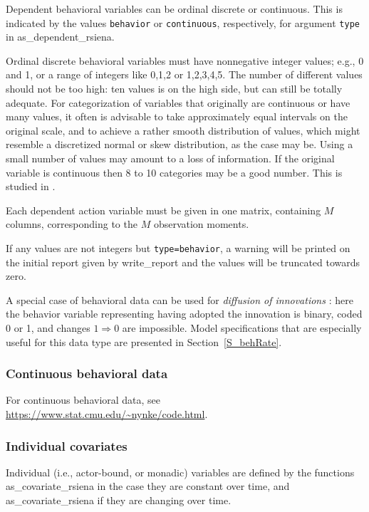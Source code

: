 \documentclass[a4paper,fleqn,11pt]{article}
\newcommand{\+}{\, + \,}
\newcommand{\sfn}[1]{\textsf{#1}}
\begin{document}
Dependent behavioral variables can be ordinal discrete or continuous.
This is indicated by the values \texttt{behavior}  or \texttt{continuous},
respectively, for argument \texttt{type} in \sfn{as\_dependent\_rsiena}.

Ordinal discrete behavioral variables must have nonnegative integer values;
e.g., 0 and 1, or a range of integers like 0,1,2 or 1,2,3,4,5.
The number of different values should not be too high: ten values
is on the high side, but can still be totally adequate.
For categorization of variables that originally are
continuous or have many values, it often is advisable to take
approximately equal intervals on the original scale, and to achieve
a rather smooth distribution of values, which might resemble a
discretized normal or skew distribution, as the case may be.
Using a small number of values may amount to a loss of information.
If the original variable is continuous then 8 to 10 categories may be
a good number. This is studied in \citet[][Chapter 6]{Niezink2018a}.

Each dependent action variable must be given in one
matrix, containing $M$ columns, corresponding to the $M$
observation moments.

If any values are not integers but \texttt{type=behavior},
a warning will be printed on the initial report
given by \sfn{write\_report} and the values will be truncated towards zero.

A special case of behavioral data can be used for
\emph{diffusion of innovations} \citep{Greenan15}:
here the behavior variable representing
having adopted the innovation is binary, coded 0 or 1, and
changes $1 \Rightarrow 0$ are impossible.
Model specifications that are especially useful for this data type
are presented in Section~\ref{S_behRate}.


\subsubsection{Continuous behavioral data}

For continuous behavioral data,
see \url{https://www.stat.cmu.edu/~nynke/code.html}.


\subsubsection{Individual covariates}
\label{S_covariates}

Individual (i.e., actor-bound, or monadic) variables
are defined by the functions
\sfn{as\_covariate\_rsiena} in the case they are constant over time,
and \sfn{as\_covariate\_rsiena} if they are changing over time.
\end{document}
